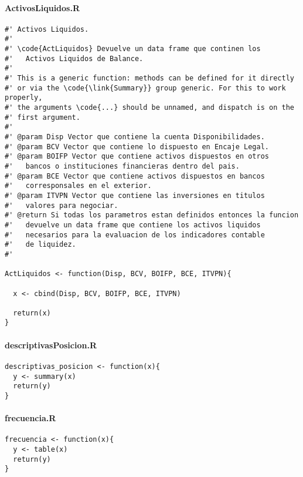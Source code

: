 \documentclass[]{article}
\begin{document}
\hypertarget{activosliquidos.r}{%
\paragraph{ActivosLiquidos.R}\label{activosliquidos.r}}

\begin{verbatim}
#' Activos Liquidos.
#'
#' \code{ActLiquidos} Devuelve un data frame que continen los 
#'   Activos Liquidos de Balance.
#'
#' This is a generic function: methods can be defined for it directly
#' or via the \code{\link{Summary}} group generic. For this to work properly,
#' the arguments \code{...} should be unnamed, and dispatch is on the
#' first argument.
#'
#' @param Disp Vector que contiene la cuenta Disponibilidades.
#' @param BCV Vector que contiene lo dispuesto en Encaje Legal.
#' @param BOIFP Vector que contiene activos dispuestos en otros
#'   bancos o instituciones financieras dentro del pais.
#' @param BCE Vector que contiene activos dispuestos en bancos
#'   corresponsales en el exterior.
#' @param ITVPN Vector que contiene las inversiones en titulos
#'   valores para negociar.
#' @return Si todas los parametros estan definidos entonces la funcion
#'   devuelve un data frame que contiene los activos liquidos 
#'   necesarios para la evaluacion de los indicadores contable 
#'   de liquidez.
#'   

ActLiquidos <- function(Disp, BCV, BOIFP, BCE, ITVPN){
  
  x <- cbind(Disp, BCV, BOIFP, BCE, ITVPN)
  
  return(x)
}
\end{verbatim}

\hypertarget{descriptivasposicion.r}{%
\paragraph{descriptivasPosicion.R}\label{descriptivasposicion.r}}

\begin{verbatim}
descriptivas_posicion <- function(x){
  y <- summary(x)
  return(y)
}
\end{verbatim}

\hypertarget{frecuencia.r}{%
\paragraph{frecuencia.R}\label{frecuencia.r}}

\begin{verbatim}
frecuencia <- function(x){
  y <- table(x)
  return(y)
}
\end{verbatim}
\end{document}
